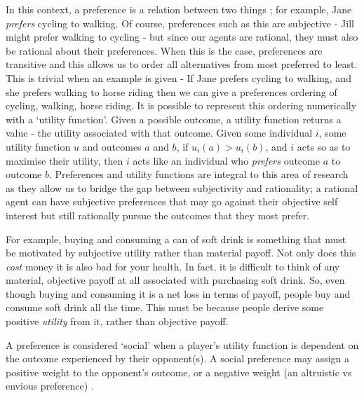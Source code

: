 \documentclass[11pt]{book}
\newcommand*{\np}{\par\noindent\newline}
\begin{document}
\np In this context, a preference is a relation between two things \citep{angner_course_2012}; for example, Jane \textit{prefers} cycling to walking. 
Of course, preferences such as this are subjective - Jill might prefer walking to cycling - but since our agents are rational, they must also be rational about their preferences. 
When this is the case, preferences are transitive and this allows us to order all alternatives from most preferred to least. 
This is trivial when an example is given - If Jane prefers cycling to walking, and she prefers walking to horse riding then we can give a preferences ordering of cycling, walking, horse riding.
It is possible to represent this ordering numerically with a `utility function'.
Given a possible outcome, a utility function returns a value - the utility associated with that outcome.
Given some individual $i$, some utility function $u$ and outcomes $a$ and $b$, 
if $u_i(a) > u_i(b)$, and $i$ acts so as to maximise their utility, then $i$ acts like an individual who \textit{prefers} outcome $a$ to outcome $b$.
Preferences and utility functions are integral to this area of research as they allow us to bridge the gap between subjectivity and rationality; 
a rational agent can have subjective preferences that may go against their objective self interest but still rationally pursue the outcomes that they most prefer.

\np For example, buying and consuming a can of soft drink is something that must be motivated by subjective utility rather than material payoff. 
Not only does this \textit{cost} money it is also bad for your health. 
In fact, it is difficult to think of any material, objective payoff at all associated with purchasing soft drink. 
So, even though buying and consuming it is a net loss in terms of payoff, people buy and consume soft drink all the time. 
This must be because people derive some positive \textit{utility} from it, rather than objective payoff.

\np A preference is considered `social' when a player's utility function is dependent on the outcome experienced by their opponent(s). 
A social preference may assign a positive weight to the opponent's outcome, or a negative weight (an altruistic vs envious preference) \cite{angner_course_2012}.
\end{document}
